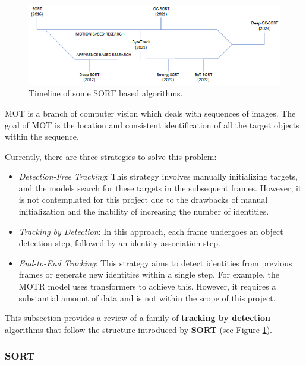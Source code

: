 
\begin{figure}[!t]
    \centering
    \includegraphics[width=0.9\linewidth]{figures/04_state_of_the_art/cronologia_sort.png}
    \caption[SORT algorithms timeline]{\footnotesize{Timeline of some \ac{SORT} based algorithms.}}
    \label{fig:cronologia_sort}
    \vspace{-1em}
\end{figure}

{
    \ac{MOT} is a branch of computer vision which deals with sequences of images.
    The goal of \ac{MOT} is the location and consistent identification of all the target objects within the sequence.
    
    Currently, there are three strategies to solve this problem:
    \begin{itemize}
        \item \textit{Detection-Free Tracking}: This strategy involves manually initializing targets, and the models search for these targets in the subsequent frames.
              However, it is not contemplated for this project due to the drawbacks of manual initialization and the inability of increasing the number of identities.
        \item \textit{Tracking by Detection}: In this approach, each frame undergoes an object detection step, followed by an identity association step.
        \item \textit{End-to-End Tracking}: This strategy aims to detect identities from previous frames or generate new identities within a single step. 
              For example, the MOTR\cite{zeng2021motr} model uses transformers to achieve this. 
              However, it requires a substantial amount of data and is not within the scope of this project.
    \end{itemize}

    This subsection provides a review of a family of \textbf{tracking by detection} algorithms that follow the structure introduced by \textbf{\ac{SORT}} (see Figure \ref{fig:cronologia_sort}).
}

\subsubsection{SORT}

